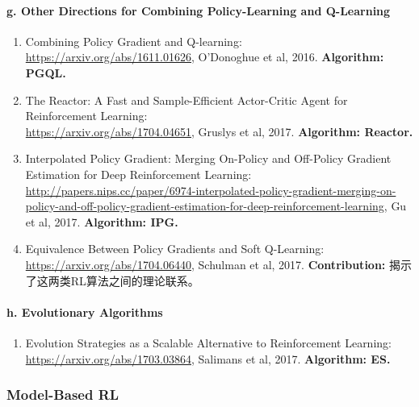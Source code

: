 \documentclass[lang=cn,11pt,a4paper]{elegant_template}
\begin{document}
\paragraph{g. Other Directions for Combining Policy-Learning and Q-Learning}
\begin{enumerate}
    \item Combining Policy Gradient and Q-learning:\\ \href{https://arxiv.org/abs/1611.01626}{https://arxiv.org/abs/1611.01626}, O’Donoghue et al, 2016. \textbf{Algorithm: PGQL.}
    \item The Reactor: A Fast and Sample-Efficient Actor-Critic Agent for Reinforcement Learning:\\ \href{https://arxiv.org/abs/1704.04651}{https://arxiv.org/abs/1704.04651}, Gruslys et al, 2017. \textbf{Algorithm: Reactor.}
    \item Interpolated Policy Gradient: Merging On-Policy and Off-Policy Gradient Estimation for Deep Reinforcement Learning:\\ \href{http://papers.nips.cc/paper/6974-interpolated-policy-gradient-merging-on-policy-and-off-policy-gradient-estimation-for-deep-reinforcement-learning}{http://papers.nips.cc/paper/6974-interpolated-policy-gradient-merging-on-policy-and-off-policy-gradient-estimation-for-deep-reinforcement-learning}, Gu et al, 2017. \textbf{Algorithm: IPG.}
    \item Equivalence Between Policy Gradients and Soft Q-Learning:\\ \href{https://arxiv.org/abs/1704.06440}{https://arxiv.org/abs/1704.06440}, Schulman et al, 2017. \textbf{Contribution:} 揭示了这两类RL算法之间的理论联系。
\end{enumerate}

\paragraph{h. Evolutionary Algorithms}
\begin{enumerate}
    \item Evolution Strategies as a Scalable Alternative to Reinforcement Learning:\\ \href{https://arxiv.org/abs/1703.03864}{https://arxiv.org/abs/1703.03864}, Salimans et al, 2017. \textbf{Algorithm: ES.}
\end{enumerate}

\subsubsection{Model-Based RL}
\end{document}
